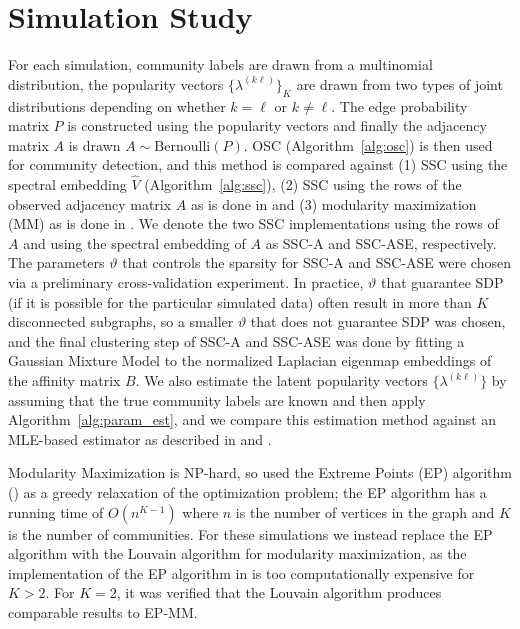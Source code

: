 \documentclass[12pt]{article}
\begin{document}
\hypertarget{simulated-examples}{%
\section{Simulation Study}\label{simulated-examples}}

For each simulation, community labels are drawn from a multinomial
distribution, the popularity vectors \(\{\lambda^{(k \ell)}\}_K\) are drawn
from two types of joint distributions depending on whether \(k =
\ell\) or $k \not = \ell$. The edge probability matrix \(P\) is constructed using the popularity
vectors and finally the adjacency matrix \(A\)
is drawn \(A \sim \mathrm{Bernoulli}(P)\). OSC (Algorithm~\ref{alg:osc}) is then used for community detection, and this
method is compared against (1) SSC using the spectral embedding $\hat{V}$
(Algorithm~\ref{alg:ssc}), (2) SSC using the rows of the
observed adjacency matrix $A$ as is done in \citet{noroozi2019estimation}
and (3) modularity maximization (MM) as is done in
\citet{307cbeb9b1be48299388437423d94bf1}. We denote the two SSC
implementations using the rows of $A$ and using the spectral embedding
of $A$ as SSC-A and SSC-ASE, respectively. 
The parameters \(\vartheta\)
that controls the sparsity for SSC-A and SSC-ASE were chosen via a preliminary cross-validation experiment. 
In practice, $\vartheta$ that guarantee SDP (if it is possible for the particular simulated data) often result in more than $K$ disconnected subgraphs, so a smaller $\vartheta$ that does not guarantee SDP was chosen, 
and the final clustering step of SSC-A and SSC-ASE was done
by fitting a Gaussian Mixture Model to the normalized Laplacian
eigenmap embeddings \citep{belkin03:_laplac} of the affinity matrix \(B\).
We also estimate the latent popularity vectors $\{\lambda^{(k \ell)}\}$
by assuming that the true community labels are known and then apply
Algorithm~\ref{alg:param_est}, and we compare this estimation method against an
MLE-based estimator as described in \citet{noroozi2019estimation} and
\citet{307cbeb9b1be48299388437423d94bf1}.

Modularity Maximization is NP-hard, so
\citet{307cbeb9b1be48299388437423d94bf1} used the Extreme Points
(EP) algorithm (\cite{le2016}) as a greedy
relaxation of the optimization problem; the EP algorithm has a running
time of $O(n^{K-1})$ where $n$ is the number of vertices in the graph
and $K$ is the number of communities.
For these simulations we instead replace the EP algorithm with the
Louvain algorithm for modularity maximization,
as the implementation of the EP algorithm in
\citet{307cbeb9b1be48299388437423d94bf1} is too computationally expensive for \(K > 2\). For \(K = 2\), it
was verified that the Louvain algorithm produces comparable results
to EP-MM.
\end{document}
